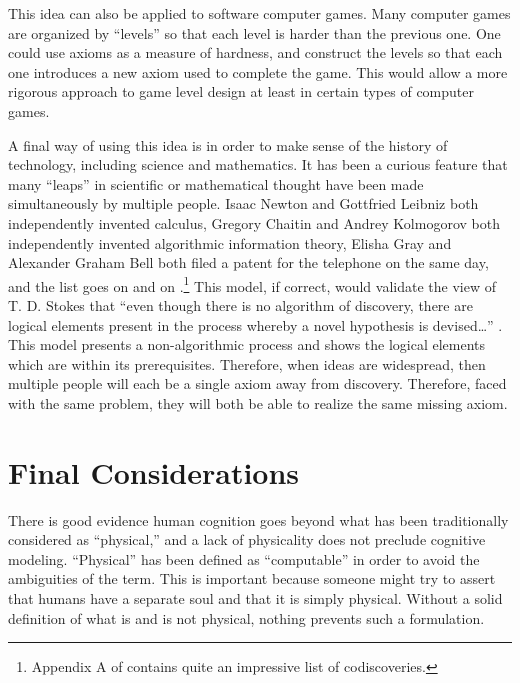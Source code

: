 This idea can also be applied to software computer games.  Many computer games are organized by ``levels'' so that each level is harder than the previous one.  One could use axioms as a measure of hardness, and construct the levels so that each one introduces a new axiom used to complete the game.  This would allow a more rigorous approach to game level design at least in certain types of computer games.

A final way of using this idea is in order to make sense of the history of technology, including science and mathematics.  It has been a curious feature that many ``leaps'' in scientific or mathematical thought have been made simultaneously by multiple people.  Isaac Newton and Gottfried Leibniz both independently invented calculus, Gregory Chaitin and Andrey Kolmogorov both independently invented algorithmic information theory, Elisha Gray and Alexander Graham Bell both filed a patent for the telephone on the same day, and the list goes on and on .\footnote{Appendix A of \citet{aboitesetal2012} contains quite an impressive list of codiscoveries.}  This model, if correct, would validate the view of T. D. Stokes that ``even though there is no algorithm of discovery, there are logical elements present in the process whereby a novel hypothesis is devised\ldots{}'' \citep[][p.~111]{stokes1986}.  This model presents a non-algorithmic process and shows the logical elements which are within its prerequisites.  Therefore, when ideas are widespread, then multiple people will each be a single axiom away from discovery.  Therefore, faced with the same problem, they will both be able to realize the same missing axiom.

\section{Final Considerations}
\label{sec:final_considerations}

There is good evidence human cognition goes beyond what has been traditionally considered as ``physical,'' and a lack of physicality does not preclude cognitive modeling.  ``Physical'' has been defined as ``computable'' in order to avoid the ambiguities of the term.  This is important because someone might try to assert that humans have a separate soul and that it is simply physical.  Without a solid definition of what is and is not physical, nothing prevents such a formulation.   


